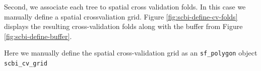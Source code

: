\documentclass[12pt]{article}
\newenvironment{Shaded}{\begin{snugshade}}{\end{snugshade}}
\newcommand{\DataTypeTok}[1]{\textcolor[rgb]{0.13,0.29,0.53}{#1}}
\newcommand{\DecValTok}[1]{\textcolor[rgb]{0.00,0.00,0.81}{#1}}
\newcommand{\KeywordTok}[1]{\textcolor[rgb]{0.13,0.29,0.53}{\textbf{#1}}}
\newcommand{\NormalTok}[1]{#1}
\newcommand{\OperatorTok}[1]{\textcolor[rgb]{0.81,0.36,0.00}{\textbf{#1}}}
\newcommand{\StringTok}[1]{\textcolor[rgb]{0.31,0.60,0.02}{#1}}
\begin{document}
Second, we associate each tree to spatial cross validation folds. In
this case we manually define a spatial crossvaliation grid. Figure
\ref{fig:scbi-define-cv-folds} displays the resulting cross-validation
folds along with the buffer from Figure \ref{fig:scbi-define-buffer}.

Here we manually define the spatial cross-validation grid as an
\texttt{sf\_polygon} object \texttt{scbi\_cv\_grid}

\begin{Shaded}
\end{Shaded}
\end{document}
